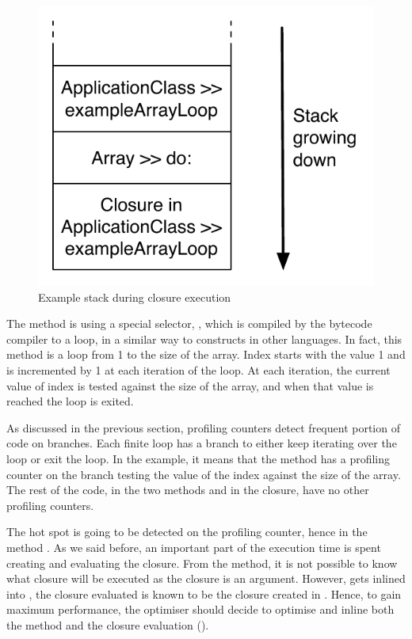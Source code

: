\documentclass[a4paper,12pt,twoside]{../includes/ThesisStyle}
\begin{document}
\begin{figure}[h!]
    \begin{center}
        \includegraphics[width=0.4\linewidth]{ExampleLoopStack}
        \caption{Example stack during closure execution}
        \label{fig:ExampleLoopStack}
    \end{center}
\end{figure}

The method  is using a special selector, , which is compiled by the bytecode compiler to a loop, in a similar way to  constructs in other languages. In fact, this method is a loop from 1 to the size of the array. Index starts with the value 1 and is incremented by 1 at each iteration of the loop. At each iteration, the current value of index is tested against the size of the array, and when that value is reached the loop is exited.

As discussed in the previous section, profiling counters detect frequent portion of code on branches. Each finite loop has a branch to either keep iterating over the loop or exit the loop. In the example, it means that the method  has a profiling counter on the branch testing the value of the index against the size of the array. The rest of the code, in the two methods and in the closure, have no other profiling counters.

The hot spot is going to be detected on the profiling counter, hence in the method . As we said before, an important part of the execution time is spent creating and evaluating the closure. From the  method, it is not possible to know what closure will be executed as the closure is an argument. However,   gets inlined into , the closure evaluated is known to be the closure created in  . Hence, to gain maximum performance, the optimiser should decide to optimise  and inline both the  method and the closure evaluation (). 
\end{document}
